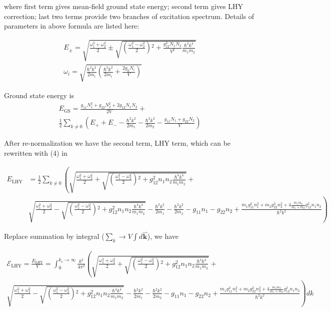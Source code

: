 where first term gives mean-field ground state energy; second term gives LHY correction; last two terms provide two branches of excitation spectrum.
Details of parameters in above formula are listed here:

\begin{equation}
\begin{split}
E_{\pm }=\sqrt{\frac{\omega _1^2+\omega _2^2}{2}\pm \sqrt{\left(\frac{\omega _1^2-\omega _2^2}{2}\right){}^2+\frac{g_{12}^2N_1N_2}{V^2}\frac{\hbar
^2k^4}{m_1m_2}}}\\
\omega _i=\sqrt{\frac{\hbar ^2k^2}{2m_i}\left(\frac{\hbar ^2k^2}{2m_i}+\frac{2g_{\text{ii}}N_i}{V}\right)}\end{split}
\end{equation}

Ground state energy is
\begin{equation}
\begin{split}
E_{\text{GS}}=\frac{g_{11}N_1^2+g_{22}N_2^2+2g_{12}N_1N_2}{2V}+\\
\frac{1}{2}\sum _{k\neq 0} \left(E_++E_--\frac{\hbar ^2k^2}{2m_1}-\frac{\hbar ^2k^2}{2m_2}-\frac{g_{11}N_1+g_{22}N_2}{V}\right)
\end{split}
\end{equation}

After re-normalization we have the second term, LHY term, which can be rewritten with (4) in

\begin{equation}
\begin{split}
E_{\text{LHY}}&=\frac{1}{2}\sum _{k\neq 0} \left(\sqrt{\frac{\omega _1^2+\omega _2^2}{2}+\sqrt{\left(\frac{\omega _1^2-\omega _2^2}{2}\right){}^2+g_{12}^2n_1n_2\frac{\hbar^4k^4}{m_1m_2}}}+\right.\\
&\left.\sqrt{\frac{\omega _1^2+\omega _2^2}{2}-\sqrt{\left(\frac{\omega _1^2-\omega _2^2}{2}\right){}^2+g_{12}^2n_1n_2\frac{\hbar ^4k^4}{m_1m_2}}}-\frac{\hbar^2k^2}{2m_1}-\frac{\hbar ^2k^2}{2m_2}-g_{11}n_1-g_{22}n_2+\frac{m_1g_{11}^2n_1^2+m_2g_{22}^2n_2^2+4\frac{m_1m_2}{m_1+ m_2}g_{12}^2n_1n_2}{\hbar ^2k^2}\right)
\end{split}
\end{equation}

Replace summation by integral (\(\sum _k \to V\int d\pmb{\overset{\rightharpoonup }{\pmb{k}}}\)), we have

\begin{equation}
\begin{split}
\mathcal{E}_{\text{LHY}}=\frac{E_{\text{LHY}}}{V}=\int _0^{k_c\to  \infty }\frac{k^2}{4\pi ^2}\left(\sqrt{\frac{\omega _1^2+\omega _2^2}{2}+\sqrt{\left(\frac{\omega
_1^2-\omega _2^2}{2}\right){}^2+g_{12}^2n_1n_2\frac{\hbar ^4k^4}{m_1m_2}}}+\right.\\
\left.\sqrt{\frac{\omega _1^2+\omega _2^2}{2}-\sqrt{\left(\frac{\omega _1^2-\omega _2^2}{2}\right){}^2+g_{12}^2n_1n_2\frac{\hbar ^4k^4}{m_1m_2}}}-\frac{\hbar
^2k^2}{2m_1}-\frac{\hbar ^2k^2}{2m_2}-g_{11}n_1-g_{22}n_2+\frac{m_1g_{11}^2n_1^2+m_2g_{22}^2n_2^2+4\frac{m_1m_2}{m_1+ m_2}g_{12}^2n_1n_2}{\hbar ^2k^2}\right)dk
\end{split}
\end{equation}

